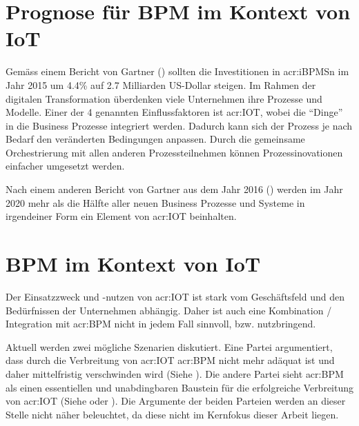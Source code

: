 \section{Prognose für BPM im Kontext von IoT}
Gemäss einem Bericht von Gartner (\cite{E:Gartner:BPM:2015}) sollten die Investitionen in \gls{acr:iBPMS}n im Jahr 2015 um 4.4\% auf 2.7 Milliarden US-Dollar steigen. Im Rahmen der digitalen Transformation überdenken viele Unternehmen ihre Prozesse und Modelle. Einer der 4 genannten Einflussfaktoren ist \gls{acr:IOT}, wobei die "`Dinge"' in die Business Prozesse integriert werden. Dadurch kann sich der Prozess je nach Bedarf den veränderten Bedingungen anpassen. Durch die gemeinsame Orchestrierung mit allen anderen Prozessteilnehmen können Prozessinovationen einfacher umgesetzt werden.

Nach einem anderen Bericht von Gartner aus dem Jahr 2016 (\cite{E:Gartner:BPM:IOT:2020}) werden im Jahr 2020 mehr als die Hälfte aller neuen Business Prozesse und Systeme in irgendeiner Form ein Element von \gls{acr:IOT} beinhalten.


\section{BPM im Kontext von IoT}
Der Einsatzzweck und -nutzen von \gls{acr:IOT} ist stark vom Geschäftsfeld und den Bedürfnissen der Unternehmen abhängig. Daher ist auch eine Kombination / Integration mit \gls{acr:BPM} nicht in jedem Fall sinnvoll, bzw. nutzbringend.

Aktuell werden zwei mögliche Szenarien diskutiert. Eine Partei argumentiert, dass durch die Verbreitung von \gls{acr:IOT} \gls{acr:BPM} nicht mehr adäquat ist und daher mittelfristig verschwinden wird (Siehe \cite{E:LinkedIn:Herring:IOTBPM}). Die andere Partei sieht \gls{acr:BPM} als einen essentiellen und unabdingbaren Baustein für die erfolgreiche Verbreitung von \gls{acr:IOT} (Siehe \cite{E:DataInformed:IOTBPM} oder \cite{E:InformationAge:IOTBPM}). Die Argumente der beiden Parteien werden an dieser Stelle nicht näher beleuchtet, da diese nicht im Kernfokus dieser Arbeit liegen.


